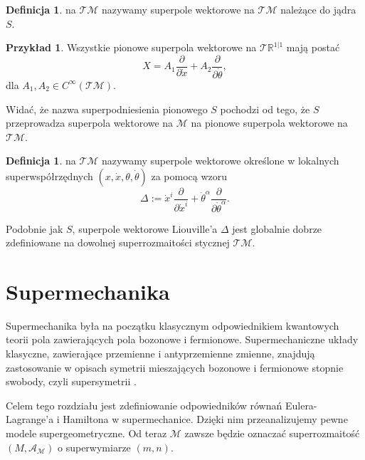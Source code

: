 \documentclass[11pt,a4paper]{report}
\theoremstyle{definition}
\newtheorem{example}[theorem]{Przykład}
\newtheorem{definition}[theorem]{Definicja}
\begin{document}
\begin{definition}  na $\mathcal{TM}$ nazywamy superpole wektorowe na $\mathcal{T}\mathcal{M}$ należące do jądra $S$.
\end{definition}
			      				 
\begin{example} Wszystkie pionowe superpola wektorowe  na $\mathcal{T}\mathbb{R}^{1|1}$ mają postać
	\begin{equation*}
		X = A_1\frac{\partial}{\partial \dot x} + A_2\frac{\partial}{\partial \dot\theta},
	\end{equation*}
	dla $A_1,A_2 \in C^\infty(\mathcal{TM})$.
\end{example}
			      				 
Widać, że nazwa superpodniesienia pionowego $S$ pochodzi od tego, że $S$ przeprowadza superpola wektorowe na $\mathcal M$ na pionowe superpola wektorowe na $\mathcal{TM}.$
			      				 
\begin{definition}  na $\mathcal{TM}$ nazywamy  superpole wektorowe określone w lokalnych superwspółrzędnych $(x, \dot x, \theta, \dot \theta)$ za pomocą wzoru
	\begin{equation*}
		\Delta:=\dot x^i\frac{\partial}{\partial \dot x^i}+\dot\theta^\alpha \frac{\partial}{\partial \dot\theta^\alpha}.
	\end{equation*}
\end{definition}
			      				
Podobnie jak $S$, superpole wektorowe Liouville'a $\Delta$ jest globalnie dobrze zdefiniowane na dowolnej superrozmaitości stycznej $\mathcal {TM}$.
			      				
\chapter{Supermechanika}
			      				
Supermechanika była na początku klasycznym odpowiednikiem kwantowych teorii pola zawierających pola bozonowe i fermionowe. Supermechaniczne układy klasyczne, zawierające przemienne i antyprzemienne zmienne, znajdują zastosowanie w opisach symetrii mieszających bozonowe i fermionowe stopnie swobody, czyli supersymetrii \cite{ibort}.
			      				
Celem tego rozdziału jest zdefiniowanie odpowiedników równań Eulera-Lagrange'a i Hamiltona w supermechanice. Dzięki nim przeanalizujemy pewne modele supergeometryczne. Od teraz $\mathcal{M}$ zawsze będzie oznaczać superrozmaitość $(M, \mathcal{A}_\mathcal{M})$ o superwymiarze $(m,n)$.
			      				
\end{document}
